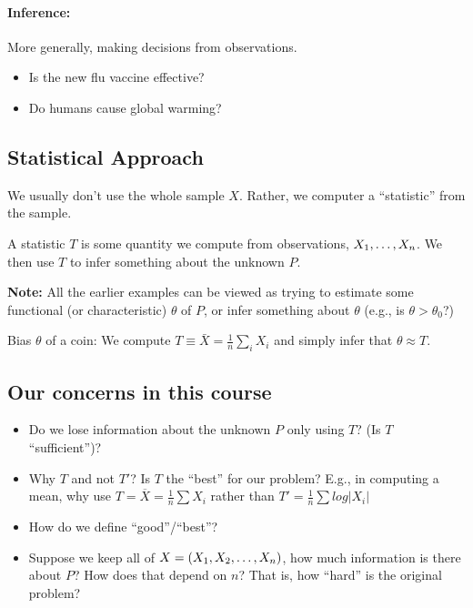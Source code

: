 \documentclass[twoside]{article}
\begin{document}
\paragraph{Inference:}
  More generally, making decisions from observations.

  \begin{example}
    \leavevmode
    \begin{itemize}
      \item Is the new flu vaccine effective?
      \item Do humans cause global warming?
    \end{itemize}
  \end{example}

\subsection{Statistical Approach}

We usually don't use the whole sample $X$. Rather, we computer a ``statistic'' from the sample.

\begin{definition}
  A statistic $T$ is some quantity we compute from observations, $X_1, \mathellipsis, X_n$. We then use $T$ to infer something about the unknown $P$.
\end{definition}

\textbf{Note:} All the earlier examples can be viewed as trying to estimate some functional (or characteristic) $\theta$ of $P$, or infer something about $\theta$ (e.g., is $\theta > \theta_0$?)

\begin{example}
  Bias $\theta$ of a coin: We compute $T \equiv \bar{X} = \frac{1}{n} \sum_i X_i$ and simply infer that $\theta \approx T$.
\end{example}

\subsection{Our concerns in this course}

\begin{itemize}
  \item Do we lose information about the unknown $P$ only using $T$? (Is $T$ ``sufficient'')?
  \item Why $T$ and not $T'$? Is $T$ the ``best'' for our problem? E.g., in computing a mean, why use $T = \overline{X} = \frac{1}{n} \sum X_i$ rather than $T' = \frac{1}{n} \sum log|X_i|$
  \item How do we define ``good''/``best''?
  \item Suppose we keep all of $X=(X_1, X_2,\mathellipsis, X_n)$, how much information is there about $P$? How does that depend on $n$? That is, how ``hard'' is the original problem?
\end{itemize}
\end{document}
